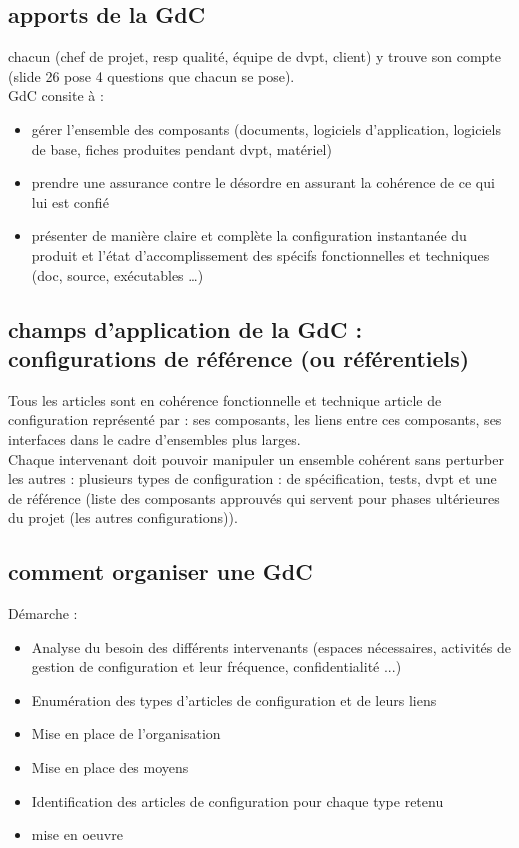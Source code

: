 	\subsection{apports de la GdC}

chacun (chef de projet, resp qualité, équipe de dvpt, client) y trouve son compte (slide 26 pose 4 questions que chacun se pose).\\
GdC consite à :
	\begin{itemize}
	\item gérer l’ensemble des composants (documents, logiciels d’application, logiciels de base, fiches produites pendant dvpt, matériel)
	\item prendre une assurance contre le désordre en assurant la cohérence de ce qui lui est confié
	\item présenter de manière claire et complète la configuration instantanée du produit et l’état d’accomplissement des spécifs fonctionnelles et techniques (doc, source, exécutables …)
	\end{itemize}

	\subsection{champs d’application de la GdC : configurations de référence (ou référentiels)}

Tous les articles sont en cohérence fonctionnelle et technique
article de configuration représenté par : ses composants, les liens entre ces composants, ses interfaces dans le cadre d’ensembles plus larges.\\
Chaque intervenant doit pouvoir manipuler un ensemble cohérent sans perturber les autres : plusieurs types de configuration : de spécification, tests, dvpt et une de référence (liste des composants approuvés qui servent pour phases ultérieures du projet (les autres configurations)).

	\subsection{comment organiser une GdC}

Démarche :
	\begin{itemize}
	\item Analyse du besoin des différents intervenants (espaces nécessaires, activités de gestion de configuration et leur fréquence, confidentialité ...)
	\item Enumération des types d’articles de configuration et de leurs liens
	\item Mise en place de l’organisation
	\item Mise en place des moyens
	\item Identification des articles de configuration pour chaque type retenu
	\item mise en oeuvre
	\end{itemize}
\hfill\\

